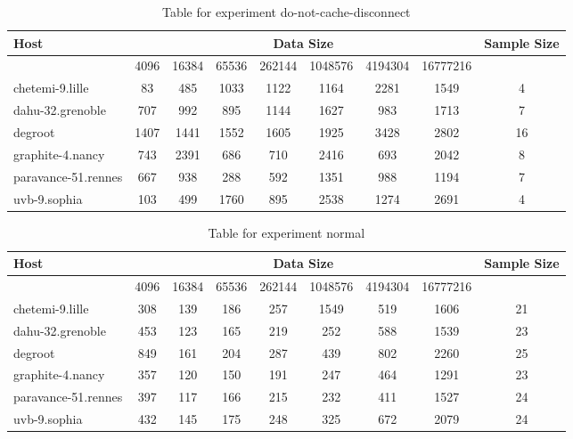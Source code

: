 \begin{table}
\caption{Table for experiment do-not-cache-disconnect}
\begin{tabular}{@{}lcccccccc@{}}
\toprule
Host    & \multicolumn{7}{c}{Data Size}          & Sample Size \\ \midrule
& 4096  & 16384  & 65536  & 262144  & 1048576  & 4194304  & 16777216              \\ \midrule
chetemi-9.lille  & 83  & 485  & 1033  & 1122  & 1164  & 2281  & 1549  & 4 \\
dahu-32.grenoble  & 707  & 992  & 895  & 1144  & 1627  & 983  & 1713  & 7 \\
degroot  & 1407  & 1441  & 1552  & 1605  & 1925  & 3428  & 2802  & 16 \\
graphite-4.nancy  & 743  & 2391  & 686  & 710  & 2416  & 693  & 2042  & 8 \\
paravance-51.rennes  & 667  & 938  & 288  & 592  & 1351  & 988  & 1194  & 7 \\
uvb-9.sophia  & 103  & 499  & 1760  & 895  & 2538  & 1274  & 2691  & 4 \\
\bottomrule
\end{tabular}
\end{table}

\begin{table}
\caption{Table for experiment normal}
\begin{tabular}{@{}lcccccccc@{}}
\toprule
Host    & \multicolumn{7}{c}{Data Size}          & Sample Size \\ \midrule
& 4096  & 16384  & 65536  & 262144  & 1048576  & 4194304  & 16777216              \\ \midrule
chetemi-9.lille  & 308  & 139  & 186  & 257  & 1549  & 519  & 1606  & 21 \\
dahu-32.grenoble  & 453  & 123  & 165  & 219  & 252  & 588  & 1539  & 23 \\
degroot  & 849  & 161  & 204  & 287  & 439  & 802  & 2260  & 25 \\
graphite-4.nancy  & 357  & 120  & 150  & 191  & 247  & 464  & 1291  & 23 \\
paravance-51.rennes  & 397  & 117  & 166  & 215  & 232  & 411  & 1527  & 24 \\
uvb-9.sophia  & 432  & 145  & 175  & 248  & 325  & 672  & 2079  & 24 \\
\bottomrule
\end{tabular}
\end{table}



